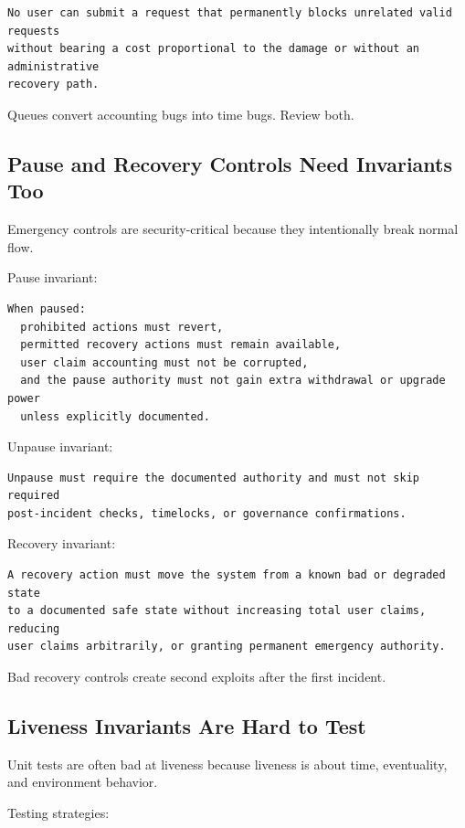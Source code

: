 \begin{lstlisting}
No user can submit a request that permanently blocks unrelated valid requests
without bearing a cost proportional to the damage or without an administrative
recovery path.
\end{lstlisting}

Queues convert accounting bugs into time bugs. Review both.

\subsection{Pause and Recovery Controls Need Invariants Too}

Emergency controls are security-critical because they intentionally
break normal flow.

Pause invariant:

\begin{lstlisting}
When paused:
  prohibited actions must revert,
  permitted recovery actions must remain available,
  user claim accounting must not be corrupted,
  and the pause authority must not gain extra withdrawal or upgrade power
  unless explicitly documented.
\end{lstlisting}

Unpause invariant:

\begin{lstlisting}
Unpause must require the documented authority and must not skip required
post-incident checks, timelocks, or governance confirmations.
\end{lstlisting}

Recovery invariant:

\begin{lstlisting}
A recovery action must move the system from a known bad or degraded state
to a documented safe state without increasing total user claims, reducing
user claims arbitrarily, or granting permanent emergency authority.
\end{lstlisting}

Bad recovery controls create second exploits after the first incident.

\subsection{Liveness Invariants Are Hard to Test}

Unit tests are often bad at liveness because liveness is about time,
eventuality, and environment behavior.

Testing strategies:

